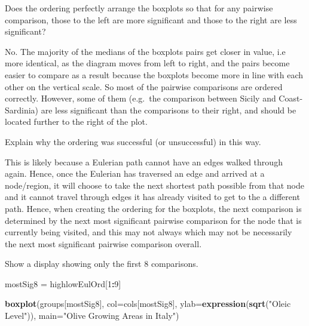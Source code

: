 \documentclass[9pt,letter]{article}
\newenvironment{Shaded}{\begin{snugshade}}{\end{snugshade}}
\newcommand{\KeywordTok}[1]{\textcolor[rgb]{0.13,0.29,0.53}{\textbf{#1}}}
\newcommand{\DataTypeTok}[1]{\textcolor[rgb]{0.13,0.29,0.53}{#1}}
\newcommand{\DecValTok}[1]{\textcolor[rgb]{0.00,0.00,0.81}{#1}}
\newcommand{\StringTok}[1]{\textcolor[rgb]{0.31,0.60,0.02}{#1}}
\newcommand{\OperatorTok}[1]{\textcolor[rgb]{0.81,0.36,0.00}{\textbf{#1}}}
\newcommand{\NormalTok}[1]{#1}
\begin{document}
\item 

Does the ordering perfectly arrange the boxplots so that for any
pairwise comparison, those to the left are more significant and those to
the right are less significant?

No. The majority of the medians of the boxplots pairs get closer in
value, i.e more identical, as the diagram moves from left to right, and
the pairs become easier to compare as a result because the boxplots
become more in line with each other on the vertical scale. So most of
the pairwise comparisons are ordered correctly. However, some of them
(e.g.~the comparison between Sicily and Coast-Sardinia) are less
significant than the comparisons to their right, and should be located
further to the right of the plot.

\item 

Explain why the ordering was successful (or unsuccessful) in this way.

This is likely because a Eulerian path cannot have an edges walked
through again. Hence, once the Eulerian has traversed an edge and
arrived at a node/region, it will choose to take the next shortest path
possible from that node and it cannot travel through edges it has
already visited to get to the a different path. Hence, when creating the
ordering for the boxplots, the next comparison is determined by the next
most significant pairwise comparison for the node that is currently
being visited, and this may not always which may not be necessarily the
next most significant pairwise comparison overall.

\item 

Show a display showing only the first 8 comparisons.

\begin{Shaded}
\begin{Highlighting}[]
\NormalTok{mostSig8 =}\StringTok{ }\NormalTok{highlowEulOrd[}\DecValTok{1}\OperatorTok{:}\DecValTok{9}\NormalTok{]}

\KeywordTok{boxplot}\NormalTok{(groups[mostSig8], }
        \DataTypeTok{col=}\NormalTok{cols[mostSig8],}
        \DataTypeTok{ylab=}\KeywordTok{expression}\NormalTok{(}\KeywordTok{sqrt}\NormalTok{(}\StringTok{"Oleic Level"}\NormalTok{)),}
        \DataTypeTok{main=}\StringTok{"Olive Growing Areas in Italy"}\NormalTok{)}
\end{Highlighting}
\end{Shaded}
\end{document}
